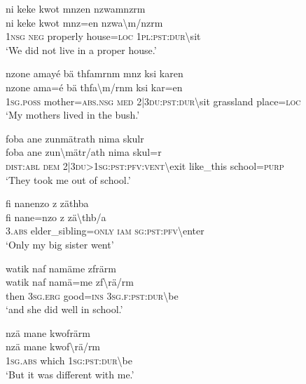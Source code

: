\ea\label{ex:14:a3106}
ni keke kwot mnzen nzwamnzrm\\
\gll ni	keke	kwot	mnz=en	nzwa{\textbackslash}m/nzrm\\
     1\textsc{nsg}	\textsc{neg}	properly	house=\textsc{loc}	1\textsc{pl}:\textsc{pst}:\textsc{dur}{\textbackslash}sit\\
\glt `We did not live in a proper house.'
\z

\ea\label{ex:14:a3108}
nzone amayé bä thfamrnm mnz ksi karen\\
\gll nzone	ama=é	bä	thfa{\textbackslash}m/rnm	ksi	kar=en\\
     1\textsc{sg}.\textsc{poss}	mother=\textsc{abs}.\textsc{nsg}	\textsc{med}	2|3\textsc{du}:\textsc{pst}:\textsc{dur}{\textbackslash}sit	grassland	place=\textsc{loc}\\
\glt `My mothers lived in the bush.'
\z

\ea\label{ex:14:a3109}
foba ane zunmätrath nima skulr\\
\gll foba	ane	zun{\textbackslash}mätr/ath	nima	skul=r\\
     \textsc{dist}:\textsc{abl}	\textsc{dem}	2|3\textsc{du}>1\textsc{sg}:\textsc{pst}:\textsc{pfv}:\textsc{vent}{\textbackslash}exit	like\_this	school=\textsc{purp}\\
\glt `They took me out of school.'
\z

\ea\label{ex:14:a3110}
fi nanenzo z zäthba\\
\gll fi	nane=nzo	z	zä{\textbackslash}thb/a\\
     3.\textsc{abs}	elder\_sibling=\textsc{only}	\textsc{iam}	\textsc{sg}:\textsc{pst}:\textsc{pfv}{\textbackslash}enter\\
\glt `Only my big sister went'
\z

\ea\label{ex:14:a3111}
watik naf namäme zfrärm\\
\gll watik	naf	namä=me	zf{\textbackslash}rä/rm\\
     then	3\textsc{sg}.\textsc{erg}	good=\textsc{ins}	3\textsc{sg}.\textsc{f}:\textsc{pst}:\textsc{dur}{\textbackslash}be\\
\glt `and she did well in school.'
\z

\ea\label{ex:14:a3112}
nzä mane kwofrärm\\
\gll nzä	mane	kwof{\textbackslash}rä/rm\\
     1\textsc{sg}.\textsc{abs}	which	1\textsc{sg}:\textsc{pst}:\textsc{dur}{\textbackslash}be\\
\glt `But it was different with me.'
\z

